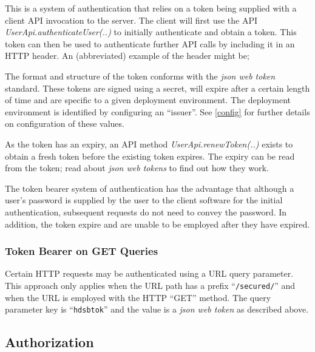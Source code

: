 This is a system of authentication that relies on a token being supplied with a client API invocation to the server.  The client will first use the API {\it UserApi.authenticateUser(..)} to initially authenticate and obtain a token.  This token can then be used to authenticate further API calls by including it in an HTTP header.  An (abbreviated) example of the header might be;


The format and structure of the token conforms with the {\it json web token} standard.  These tokens are signed using a secret, will expire after a certain length of time and are specific to a given deployment environment.  The deployment environment is identified by configuring an ``issuer''.  See \ref{config} for further details on configuration of these values.

As the token has an expiry, an API method {\it UserApi.renewToken(..)} exists to obtain a fresh token before the existing token expires.  The expiry can be read from the token; read about {\it json web tokens} to find out how they work.

The token bearer system of authentication has the advantage that although a user's password is supplied by the user to the client software for the initial authentication, subsequent requests do not need to convey the password.  In addition, the token expire and are unable to be employed after they have expired.

\subsubsection{Token Bearer on GET Queries}

Certain HTTP requests may be authenticated using a URL query parameter.  This approach only applies when the URL path has a prefix ``{\tt /secured/}'' and when the URL is employed with the HTTP ``GET'' method.  The query parameter key is ``{\tt hdsbtok}'' and the value is a {\it json web token} as described above.



\subsection{Authorization}

